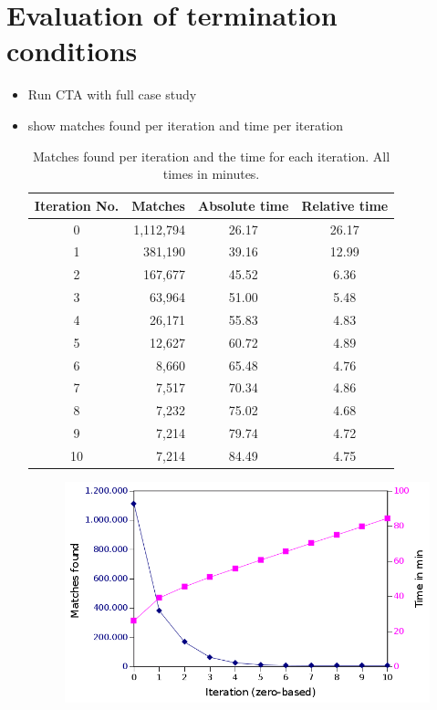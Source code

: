 \section{Evaluation of termination conditions}
\begin{itemize}
	\item Run CTA with full case study
	\item show matches found per iteration and time per iteration

	\begin{table}
		\centering
	\begin{tabular}{|c|r|c|c|}
		  \hline
		  Iteration No. & Matches & Absolute time& Relative time \\
		  \hline
     		    0  & 1,112,794 & 26.17 & 26.17\\
	            1  & 381,190   & 39.16 & 12.99\\
		    2  & 167,677   & 45.52 & 6.36\\
		    3  & 63,964    & 51.00 & 5.48\\
		    4  & 26,171    & 55.83 & 4.83\\
		    5  & 12,627    & 60.72 & 4.89\\
		    6  & 8,660     & 65.48 & 4.76\\
		    7  & 7,517     & 70.34 & 4.86\\
		    8  & 7,232     & 75.02 & 4.68\\
		    9  & 7,214     & 79.74 & 4.72\\
		    10 & 7,214     & 84.49 & 4.75\\
		  \hline
		   \end{tabular}
		   \caption{Matches found per iteration and the time for each iteration. All times in minutes.}
		   \label{tab:timesandmatchesperiteration}
	\end{table}

	\begin{figure}
		\includegraphics[width=\textwidth]{chapters/casestudy/hasehase.png}
		\caption{}
		\label{fig:hasehase}
	\end{figure}
\end{itemize}


